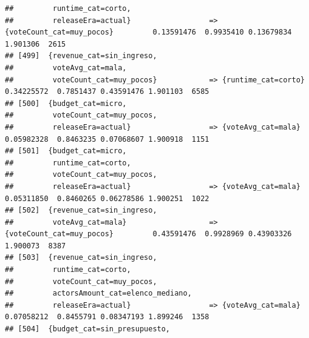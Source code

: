 \documentclass[
]{article}
\begin{document}
\begin{verbatim}
##         runtime_cat=corto,                                                                                                      
##         releaseEra=actual}                  => {voteCount_cat=muy_pocos}         0.13591476  0.9935410 0.13679834 1.901306  2615
## [499]  {revenue_cat=sin_ingreso,                                                                                                
##         voteAvg_cat=mala,                                                                                                       
##         voteCount_cat=muy_pocos}            => {runtime_cat=corto}               0.34225572  0.7851437 0.43591476 1.901103  6585
## [500]  {budget_cat=micro,                                                                                                       
##         voteCount_cat=muy_pocos,                                                                                                
##         releaseEra=actual}                  => {voteAvg_cat=mala}                0.05982328  0.8463235 0.07068607 1.900918  1151
## [501]  {budget_cat=micro,                                                                                                       
##         runtime_cat=corto,                                                                                                      
##         voteCount_cat=muy_pocos,                                                                                                
##         releaseEra=actual}                  => {voteAvg_cat=mala}                0.05311850  0.8460265 0.06278586 1.900251  1022
## [502]  {revenue_cat=sin_ingreso,                                                                                                
##         voteAvg_cat=mala}                   => {voteCount_cat=muy_pocos}         0.43591476  0.9928969 0.43903326 1.900073  8387
## [503]  {revenue_cat=sin_ingreso,                                                                                                
##         runtime_cat=corto,                                                                                                      
##         voteCount_cat=muy_pocos,                                                                                                
##         actorsAmount_cat=elenco_mediano,                                                                                        
##         releaseEra=actual}                  => {voteAvg_cat=mala}                0.07058212  0.8455791 0.08347193 1.899246  1358
## [504]  {budget_cat=sin_presupuesto,                                                                                             

\end{verbatim}
\end{document}
